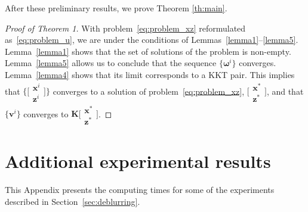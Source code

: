 \documentclass[10pt,twocolumn,twoside]{IEEEtran}
\newcommand{\x}{\mathbf{x}} %
\newcommand{\z}{\mathbf{z}} %
\newcommand{\vs}{\mathbf{v}} %
\newcommand{\K}{\mathbf{K}} %
\begin{document}
After these preliminary results, we prove Theorem \ref{th:main}.%


\begin{proof}[Proof of Theorem 1]
	With problem~\eqref{eq:problem_xz} reformulated as~\eqref{eq:problem_u}, we are under the conditions of Lemmas~\ref{lemma1}--\ref{lemma5}. Lemma~\ref{lemma1} shows that the set of solutions of the problem is non-empty. Lemma~\ref{lemma5} allows us to conclude that the sequence $\{\bm{\omega}^i\}$ converges. Lemma~\ref{lemma4} shows that its limit corresponds to a KKT pair. This implies that $\big\{\big[\begin{smallmatrix} \x^i \\ \z^i \end{smallmatrix}\big]\big\}$ converges to a solution of problem~\eqref{eq:problem_xz}, $\big[\begin{smallmatrix} \x^* \\ \z^* \end{smallmatrix}\big]$, and that $\{\vs^i\}$ converges to $\K \big[\begin{smallmatrix} \x^* \\ \z^* \end{smallmatrix}\big]$.
\end{proof}

\section{Additional experimental results}
\label{sec:app_exp}

This Appendix presents the computing times for some of the experiments described in \mbox{Section~\ref{sec:deblurring}}.
\end{document}

